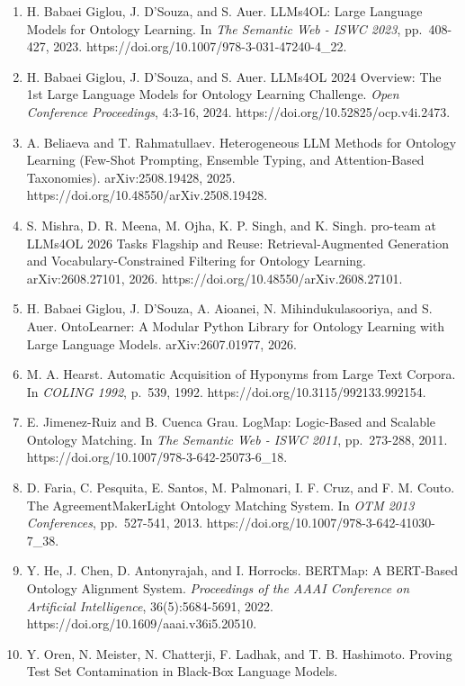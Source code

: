 \documentclass[
]{article}
\providecommand{\tightlist}{%
  \setlength{\itemsep}{0pt}\setlength{\parskip}{0pt}}
\begin{document}
\begin{enumerate}
\def\labelenumi{\arabic{enumi}.}
\tightlist
\item
  H. Babaei Giglou, J. D'Souza, and S. Auer. LLMs4OL: Large Language
  Models for Ontology Learning. In \emph{The Semantic Web - ISWC 2023},
  pp.~408-427, 2023. https://doi.org/10.1007/978-3-031-47240-4\_22.
\item
  H. Babaei Giglou, J. D'Souza, and S. Auer. LLMs4OL 2024 Overview: The
  1st Large Language Models for Ontology Learning Challenge. \emph{Open
  Conference Proceedings}, 4:3-16, 2024.
  https://doi.org/10.52825/ocp.v4i.2473.
\item
  A. Beliaeva and T. Rahmatullaev. Heterogeneous LLM Methods for
  Ontology Learning (Few-Shot Prompting, Ensemble Typing, and
  Attention-Based Taxonomies). arXiv:2508.19428, 2025.
  https://doi.org/10.48550/arXiv.2508.19428.
\item
  S. Mishra, D. R. Meena, M. Ojha, K. P. Singh, and K. Singh. pro-team
  at LLMs4OL 2026 Tasks Flagship and Reuse: Retrieval-Augmented
  Generation and Vocabulary-Constrained Filtering for Ontology Learning.
  arXiv:2608.27101, 2026. https://doi.org/10.48550/arXiv.2608.27101.
\item
  H. Babaei Giglou, J. D'Souza, A. Aioanei, N. Mihindukulasooriya, and
  S. Auer. OntoLearner: A Modular Python Library for Ontology Learning
  with Large Language Models. arXiv:2607.01977, 2026.
\item
  M. A. Hearst. Automatic Acquisition of Hyponyms from Large Text
  Corpora. In \emph{COLING 1992}, p.~539, 1992.
  https://doi.org/10.3115/992133.992154.
\item
  E. Jimenez-Ruiz and B. Cuenca Grau. LogMap: Logic-Based and Scalable
  Ontology Matching. In \emph{The Semantic Web - ISWC 2011},
  pp.~273-288, 2011. https://doi.org/10.1007/978-3-642-25073-6\_18.
\item
  D. Faria, C. Pesquita, E. Santos, M. Palmonari, I. F. Cruz, and F. M.
  Couto. The AgreementMakerLight Ontology Matching System. In \emph{OTM
  2013 Conferences}, pp.~527-541, 2013.
  https://doi.org/10.1007/978-3-642-41030-7\_38.
\item
  Y. He, J. Chen, D. Antonyrajah, and I. Horrocks. BERTMap: A BERT-Based
  Ontology Alignment System. \emph{Proceedings of the AAAI Conference on
  Artificial Intelligence}, 36(5):5684-5691, 2022.
  https://doi.org/10.1609/aaai.v36i5.20510.
\item
  Y. Oren, N. Meister, N. Chatterji, F. Ladhak, and T. B. Hashimoto.
  Proving Test Set Contamination in Black-Box Language Models.

\end{enumerate}
\end{document}
